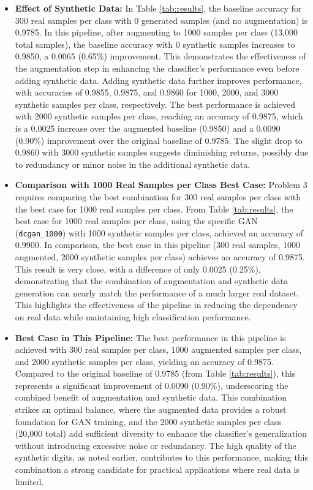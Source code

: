 \documentclass[12pt]{article}
\begin{document}
\begin{itemize}
    \item \textbf{Effect of Synthetic Data:} In Table \ref{tab:results}, the baseline accuracy for 300 real samples per class with 0 generated samples (and no augmentation) is 0.9785. In this pipeline, after augmenting to 1000 samples per class (13,000 total samples), the baseline accuracy with 0 synthetic samples increases to 0.9850, a 0.0065 (0.65\%) improvement. This demonstrates the effectiveness of the augmentation step in enhancing the classifier’s performance even before adding synthetic data. Adding synthetic data further improves performance, with accuracies of 0.9855, 0.9875, and 0.9860 for 1000, 2000, and 3000 synthetic samples per class, respectively. The best performance is achieved with 2000 synthetic samples per class, reaching an accuracy of 0.9875, which is a 0.0025 increase over the augmented baseline (0.9850) and a 0.0090 (0.90\%) improvement over the original baseline of 0.9785. The slight drop to 0.9860 with 3000 synthetic samples suggests diminishing returns, possibly due to redundancy or minor noise in the additional synthetic data.
    
    \item \textbf{Comparison with 1000 Real Samples per Class Best Case:} Problem 3 requires comparing the best combination for 300 real samples per class with the best case for 1000 real samples per class. From Table \ref{tab:results}, the best case for 1000 real samples per class, using the specific GAN (\texttt{dcgan\_1000}) with 1000 synthetic samples per class, achieved an accuracy of 0.9900. In comparison, the best case in this pipeline (300 real samples, 1000 augmented, 2000 synthetic samples per class) achieves an accuracy of 0.9875. This result is very close, with a difference of only 0.0025 (0.25\%), demonstrating that the combination of augmentation and synthetic data generation can nearly match the performance of a much larger real dataset. This highlights the effectiveness of the pipeline in reducing the dependency on real data while maintaining high classification performance.
    
    \item \textbf{Best Case in This Pipeline:} The best performance in this pipeline is achieved with 300 real samples per class, 1000 augmented samples per class, and 2000 synthetic samples per class, yielding an accuracy of 0.9875. Compared to the original baseline of 0.9785 (from Table \ref{tab:results}), this represents a significant improvement of 0.0090 (0.90\%), underscoring the combined benefit of augmentation and synthetic data. This combination strikes an optimal balance, where the augmented data provides a robust foundation for GAN training, and the 2000 synthetic samples per class (20,000 total) add sufficient diversity to enhance the classifier’s generalization without introducing excessive noise or redundancy. The high quality of the synthetic digits, as noted earlier, contributes to this performance, making this combination a strong candidate for practical applications where real data is limited.
\end{itemize}
\end{document}
